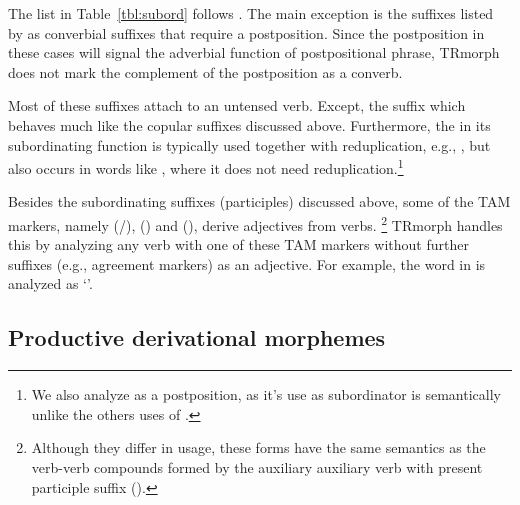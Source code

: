 \documentclass[twocolumn]{article}
\begin{document}
The list in Table~\ref{tbl:subord} follows \textcite{goksel2005}. The main
exception is the suffixes listed by \textcite{goksel2005} as converbial
suffixes that require a postposition. Since the postposition in these
cases will signal the adverbial function of postpositional phrase,
TRmorph does not mark the complement of the postposition as a converb.

%
%

Most of these suffixes attach to an untensed verb. Except, the suffix
 which behaves much like the copular suffixes discussed
above. Furthermore, the  in its subordinating function
is typically used together with reduplication, e.g., , but also occurs in words like
, where it does not need reduplication.\footnote{We
also analyze  as a postposition, as it's use as
subordinator is semantically unlike the others uses of .}

Besides the subordinating suffixes (participles) discussed above, 
some of the TAM markers, 
namely  (/),  () and  (),
derive adjectives from verbs.%
\footnote{Although they differ in usage, 
these forms have the same semantics as 
the verb-verb compounds formed by the auxiliary auxiliary verb  with present participle suffix ().}
TRmorph handles this by analyzing any verb with one of these TAM markers without further suffixes 
(e.g., agreement markers) as an adjective. 
For example, the word 
 in 
is analyzed as
`'.

\subsection{Productive derivational morphemes}
\end{document}
